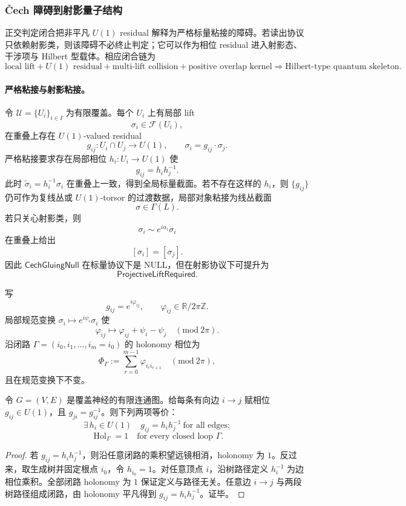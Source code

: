 \subsubsection{\v{C}ech 障碍到射影量子结构}\label{subsubsec:typed-address-biaxial-completion-cech-obstacle-projective-quantum-structure}
正交判定闭合把非平凡 \(U(1)\) residual 解释为严格标量粘接的障碍。若读出协议只依赖射影类，则该障碍不必终止判定；它可以作为相位 residual 进入射影态、干涉项与 Hilbert 型载体。相应闭合链为
\[
\text{local lift}
+
U(1)\text{ residual}
+
\text{multi-lift collision}
+
\text{positive overlap kernel}
\Longrightarrow
\text{Hilbert-type quantum skeleton}.
\]

\paragraph{严格粘接与射影粘接。}
令 \(\mathcal U=\{U_i\}_{i\in I}\) 为有限覆盖。每个 \(U_i\) 上有局部 lift
\[
\sigma_i\in\mathcal F(U_i),
\]
在重叠上存在 \(U(1)\)-valued residual
\[
g_{ij}:U_i\cap U_j\to U(1),
\qquad
\sigma_i=g_{ij}\cdot\sigma_j.
\]
严格粘接要求存在局部相位 \(h_i:U_i\to U(1)\) 使
\[
g_{ij}=h_i h_j^{-1}.
\]
此时 \(\widetilde\sigma_i=h_i^{-1}\sigma_i\) 在重叠上一致，得到全局标量截面。若不存在这样的 \(h_i\)，则 \(\{g_{ij}\}\) 仍可作为复线丛或 \(U(1)\)-torsor 的过渡数据，局部对象粘接为线丛截面
\[
\sigma\in\Gamma(L).
\]
若只关心射影类，则
\[
\sigma_i\sim e^{i\alpha_i}\sigma_i
\]
在重叠上给出
\[
[\sigma_i]=[\sigma_j].
\]
因此 \(\mathsf{CechGluingNull}\) 在标量协议下是 NULL，但在射影协议下可提升为
\[
\mathsf{ProjectiveLiftRequired}.
\]

写
\[
g_{ij}=e^{i\varphi_{ij}},
\qquad
\varphi_{ij}\in\mathbb R/2\pi\mathbb Z.
\]
局部规范变换 \(\sigma_i\mapsto e^{i\psi_i}\sigma_i\) 使
\[
\varphi_{ij}\mapsto
\varphi_{ij}+\psi_i-\psi_j
\quad(\mathrm{mod}\ 2\pi).
\]
沿闭路 \(\Gamma=(i_0,i_1,\ldots,i_m=i_0)\) 的 holonomy 相位为
\[
\Phi_\Gamma
:=
\sum_{r=0}^{m-1}\varphi_{i_ri_{r+1}}
\quad(\mathrm{mod}\ 2\pi),
\]
且在规范变换下不变。

\begin{theorem}[有限图上的相位平凡化判据]\label{thm:typed-address-biaxial-completion-phase-trivialization-finite-graph}
令 \(G=(V,E)\) 是覆盖神经的有限连通图。给每条有向边 \(i\to j\) 赋相位 \(g_{ij}\in U(1)\)，且 \(g_{ji}=g_{ij}^{-1}\)。则下列两项等价：
\[
\exists\,h_i\in U(1)\quad g_{ij}=h_i h_j^{-1}\ \text{for all edges};
\]
\[
\operatorname{Hol}_\Gamma=1\quad\text{for every closed loop }\Gamma.
\]
\end{theorem}
\begin{proof}
若 \(g_{ij}=h_i h_j^{-1}\)，则沿任意闭路的乘积望远镜相消，holonomy 为 \(1\)。反过来，取生成树并固定根点 \(i_0\)，令 \(h_{i_0}=1\)。对任意顶点 \(i\)，沿树路径定义 \(h_i^{-1}\) 为边相位乘积。全部闭路 holonomy 为 \(1\) 保证定义与路径无关。任意边 \(i\to j\) 与两段树路径组成闭路，由 holonomy 平凡得到 \(g_{ij}=h_i h_j^{-1}\)。证毕。
\end{proof}

